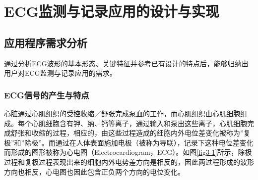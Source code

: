 \setcounter{figure}{0}
\setcounter{table}{0}
\section{ECG监测与记录应用的设计与实现}
\subsection{应用程序需求分析}
通过分析ECG波形的基本形态、关键特征并参考已有设计的特点后，能够归纳出用户对ECG监测与记录应用的需求。

\subsubsection{ECG信号的产生与特点}

心脏通过心肌组织的受控收缩／舒张完成泵血的工作，而心肌组织由心肌细胞组成。每个心肌细胞含有钾、纳、钙等离子，通过输入和泵出这些离子，心肌细胞完成舒张和收缩的过程，相应的，由这些过程造成的细胞内外电位差变化被称为”复极”和”除极”\cite{moreno_android_2012}。而通过在人体表面施加电极（被称为导联），记录下这种电位差变化而形成的图形被称为心电图（Electrocardiogram，ECG）\cite{_zhenduanxue_2013}。如图\ref{fig3-1}所示，除极过程和复极过程表现出来的细胞内外电势差方向是相反的，因此两过程形成的波形方向也相反，心电图也因此包含正负两个方向的电位变化。

